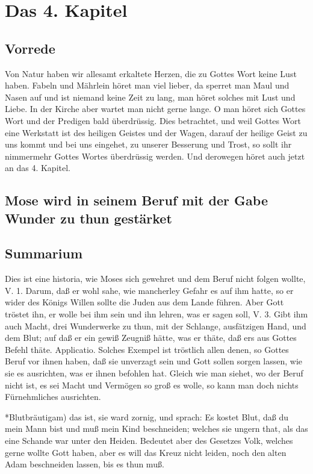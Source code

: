 \chapter{Das 4. Kapitel}

\section{Vorrede}

Von Natur haben wir allesamt erkaltete Herzen, die zu Gottes Wort keine Lust haben. Fabeln und Mährlein höret man viel lieber, da sperret man Maul und Nasen auf und ist niemand keine Zeit zu lang, man höret solches mit Lust und Liebe. In der Kirche aber wartet man nicht gerne lange. O man höret sich Gottes Wort und der Predigen bald überdrüssig. Dies betrachtet, und weil Gottes Wort eine Werkstatt ist des heiligen Geistes und der Wagen, darauf der heilige Geist zu uns kommt und bei uns eingehet, zu unserer Besserung und Trost, so sollt ihr nimmermehr Gottes Wortes überdrüssig werden. Und derowegen höret auch jetzt an das 4. Kapitel.

\section[Mose wird in seinem Beruf mit der Gabe]{Mose wird in seinem Beruf mit der Gabe Wunder zu thun gestärket}

\section{Summarium}

Dies ist eine historia, wie Moses sich gewehret und dem Beruf nicht folgen wollte, V. 1. Darum, daß er wohl sahe, wie mancherley Gefahr es auf ihm hatte, so er wider des Königs Willen sollte die Juden aus dem Lande führen. Aber Gott tröstet ihn, er wolle bei ihm sein und ihn lehren, was er sagen soll, V. 3. Gibt ihm auch Macht, drei Wunderwerke zu thun, mit der Schlange, ausfätzigen Hand, und dem Blut; auf daß er ein gewiß Zeugniß hätte, was er thäte, daß ers aus Gottes Befehl thäte. Applicatio. Solches Exempel ist tröstlich allen denen, so Gottes Beruf vor ihnen haben, daß sie unverzagt sein und Gott sollen sorgen lassen, wie sie es ausrichten, was er ihnen befohlen hat. Gleich wie man siehet, wo der Beruf nicht ist, es sei Macht und Vermögen so groß es wolle, so kann man doch nichts Fürnehmliches ausrichten.

*Blutbräutigam) das ist, sie ward zornig, und sprach: Es kostet Blut, daß du mein Mann bist und muß mein Kind beschneiden; welches sie ungern that, als das eine Schande war unter den Heiden. Bedeutet aber des Gesetzes Volk, welches gerne wollte Gott haben, aber es will das Kreuz nicht leiden, noch den alten Adam beschneiden lassen, bis es thun muß.


